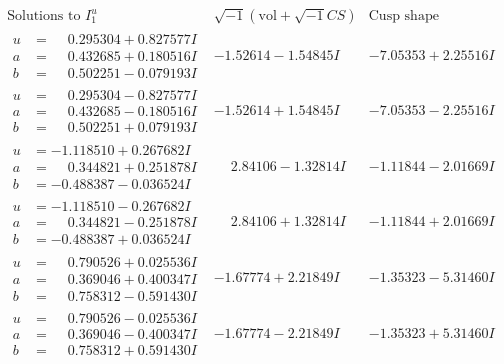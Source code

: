 \documentclass[1p]{elsarticle_modified}
\theoremstyle{definition}
\newcommand{\I}{\sqrt{-1}}
\begin{document}
$$\begin{array}{c|c|c}  
\text{Solutions to }I^u_{1}& \I (\text{vol} + \sqrt{-1}CS) & \text{Cusp shape}\\
 \hline 
\begin{aligned}
u &= \phantom{-}0.295304 + 0.827577 I \\
a &= \phantom{-}0.432685 + 0.180516 I \\
b &= \phantom{-}0.502251 - 0.079193 I\end{aligned}
 & -1.52614 - 1.54845 I & -7.05353 + 2.25516 I \\ \hline\begin{aligned}
u &= \phantom{-}0.295304 - 0.827577 I \\
a &= \phantom{-}0.432685 - 0.180516 I \\
b &= \phantom{-}0.502251 + 0.079193 I\end{aligned}
 & -1.52614 + 1.54845 I & -7.05353 - 2.25516 I \\ \hline\begin{aligned}
u &= -1.118510 + 0.267682 I \\
a &= \phantom{-}0.344821 + 0.251878 I \\
b &= -0.488387 - 0.036524 I\end{aligned}
 & \phantom{-}2.84106 - 1.32814 I & -1.11844 - 2.01669 I \\ \hline\begin{aligned}
u &= -1.118510 - 0.267682 I \\
a &= \phantom{-}0.344821 - 0.251878 I \\
b &= -0.488387 + 0.036524 I\end{aligned}
 & \phantom{-}2.84106 + 1.32814 I & -1.11844 + 2.01669 I \\ \hline\begin{aligned}
u &= \phantom{-}0.790526 + 0.025536 I \\
a &= \phantom{-}0.369046 + 0.400347 I \\
b &= \phantom{-}0.758312 - 0.591430 I\end{aligned}
 & -1.67774 + 2.21849 I & -1.35323 - 5.31460 I \\ \hline\begin{aligned}
u &= \phantom{-}0.790526 - 0.025536 I \\
a &= \phantom{-}0.369046 - 0.400347 I \\
b &= \phantom{-}0.758312 + 0.591430 I\end{aligned}
 & -1.67774 - 2.21849 I & -1.35323 + 5.31460 I \\ \hline\begin{aligned}

\end{aligned}
\end{array}$$
\end{document}
